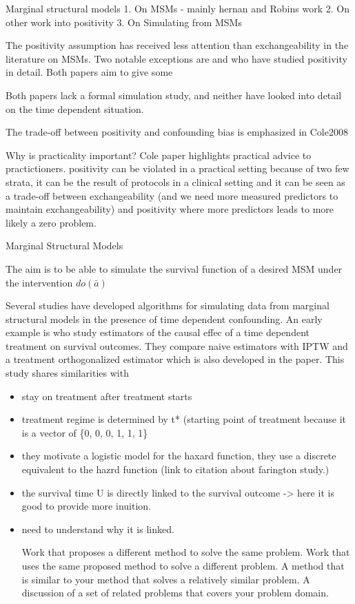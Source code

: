 \documentclass[11pt]{article}
\begin{document}
Marginal structural models 1. On MSMs - mainly hernan and Robins work 2.
On other work into positivity 3. On Simulating from MSMs

The positivity assumption has received less attention than
exchangeability in the literature on MSMs. Two notable exceptions are
\citet{Cole009} and \citet{Westereich2009} who have studied positivity
in detail. Both papers aim to give some

Both papers lack a formal simulation study, and neither have looked into
detail on the time dependent situation.

The trade-off between positivity and confounding bias is emphasized in
Cole2008

Why is practicality important? Cole paper highlights practical advice to
practictioners. positivity can be violated in a practical setting
because of two few strata, it can be the result of protocols in a
clinical setting and it can be seen as a trade-off between
exchangeability (and we need more measured predictors to maintain
exchangeability) and positivity where more predictors leads to more
likely a zero problem.

Marginal Structural Models

The aim is to be able to simulate the survival function of a desired MSM
under the intervention \(do(\bar a)\)

Several studies have developed algorithms for simulating data from
marginal structural models in the presence of time dependent
confounding. An early example is \citet{bryan2004} who study estimators
of the causal effec of a time dependent treatment on survival outcomes.
They compare naive estimators with IPTW and a treatment orthogonalized
estimator which is also developed in the paper. This study shares
similarities with \citet{Havercroft2012}

\begin{itemize}
\item
  stay on treatment after treatment starts
\item
  treatment regime is determined by t* (starting point of treatment
  because it is a vector of \{0, 0, 0, 1, 1, 1\}
\item
  they motivate a logistic model for the haxard function, they use a
  discrete equivalent to the hazrd function (link to citation about
  farington study.)
\item
  the survival time U is directly linked to the survival outcome
  -\textgreater{} here it is good to provide more inuition.
\item
  need to understand why it is linked.

  Work that proposes a different method to solve the same problem. Work
  that uses the same proposed method to solve a different problem. A
  method that is similar to your method that solves a relatively similar
  problem. A discussion of a set of related problems that covers your
  problem domain.
\end{itemize}
\end{document}
